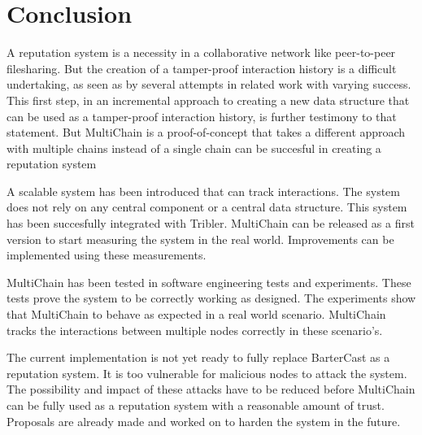 \chapter{Conclusion}
A reputation system is a necessity in a collaborative network like peer-to-peer filesharing.
But the creation of a tamper-proof interaction history is a difficult undertaking,
as seen as by several attempts in related work with varying success.
This first step, in an incremental approach to creating a new data structure
that can be used as a tamper-proof interaction history, is further testimony to that statement.
But MultiChain is a proof-of-concept that takes a different approach with multiple chains
instead of a single chain can be succesful in creating a reputation system

A scalable system has been introduced that can track interactions.
The system does not rely on any central component or a central data structure.
This system has been succesfully integrated with Tribler.
MultiChain can be released as a first version to start measuring the system in the real world.
Improvements can be implemented using these measurements.

MultiChain has been tested in software engineering tests and experiments.
These tests prove the system to be correctly working as designed.
The experiments show that MultiChain to behave as expected in a real world scenario.
MultiChain tracks the interactions between multiple nodes correctly in these scenario's.

The current implementation is not yet ready to fully replace BarterCast as a reputation system.
It is too vulnerable for malicious nodes to attack the system.
The possibility and impact of these attacks have to be reduced
before MultiChain can be fully used as a reputation system with a reasonable amount of trust.
Proposals are already made and worked on to harden the system in the future.


